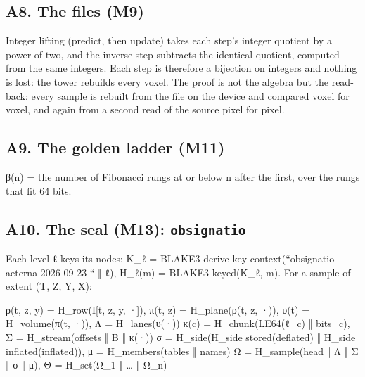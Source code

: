 \subsection{\texorpdfstring{A8. The files (M9)}{A8. The files (M9)}}

Integer lifting (predict, then update) takes each step's integer quotient by a power of two, and the inverse step subtracts the identical quotient, computed from the same integers. Each step is therefore a bijection on integers and nothing is lost: the tower rebuilds every voxel. The proof is not the algebra but the read-back: every sample is rebuilt from the file on the device and compared voxel for voxel, and again from a second read of the source pixel for pixel.

\subsection{\texorpdfstring{A9. The golden ladder (M11)}{A9. The golden ladder (M11)}}

β(n) = the number of Fibonacci rungs at or below n after the first, over the rungs that fit 64 bits.

\subsection{\texorpdfstring{A10. The seal (M13): \texttt{obsignatio}}{A10. The seal (M13): obsignatio}}

Each level ℓ keys its nodes: K\_\allowbreak{}ℓ = BLAKE3-derive-key-context(“obsignatio aeterna 2026-09-23 “ ‖ ℓ), H\_\allowbreak{}ℓ(m) = BLAKE3-keyed(K\_\allowbreak{}ℓ, m). For a sample of extent (T, Z, Y, X):

ρ(t, z, y) = H\_\allowbreak{}row(I[t, z, y, ·]),  π(t, z) = H\_\allowbreak{}plane(ρ(t, z, ·)),  υ(t) = H\_\allowbreak{}volume(π(t, ·)),  Λ = H\_\allowbreak{}lanes(υ(·)) κ(c) = H\_\allowbreak{}chunk(LE64(ℓ\_\allowbreak{}c) ‖ bits\_\allowbreak{}c),  Σ = H\_\allowbreak{}stream(offsets ‖ B ‖ κ(·)) σ = H\_\allowbreak{}side(H\_\allowbreak{}side stored(deflated) ‖ H\_\allowbreak{}side inflated(inflated)),  μ = H\_\allowbreak{}members(tables ‖ names) Ω = H\_\allowbreak{}sample(head ‖ Λ ‖ Σ ‖ σ ‖ μ),  Θ = H\_\allowbreak{}set(Ω\_\allowbreak{}1 ‖ … ‖ Ω\_\allowbreak{}n)

